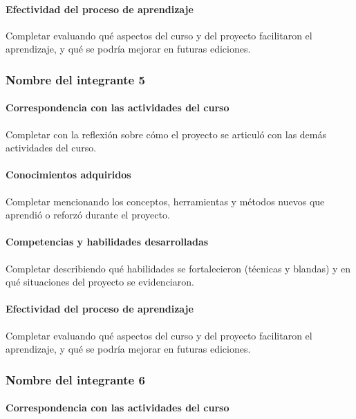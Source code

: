\documentclass[11pt,a4paper]{article}
\begin{document}
\paragraph{Efectividad del proceso de aprendizaje}

Completar evaluando qué aspectos del curso y del proyecto facilitaron el
aprendizaje, y qué se podría mejorar en futuras ediciones.

\subsubsection*{Nombre del integrante 5}


\paragraph{Correspondencia con las actividades del curso}

Completar con la reflexión sobre cómo el proyecto se articuló con las demás
actividades del curso.

\paragraph{Conocimientos adquiridos}

Completar mencionando los conceptos, herramientas y métodos nuevos que
aprendió o reforzó durante el proyecto.

\paragraph{Competencias y habilidades desarrolladas}

Completar describiendo qué habilidades se fortalecieron (técnicas y blandas)
y en qué situaciones del proyecto se evidenciaron.

\paragraph{Efectividad del proceso de aprendizaje}

Completar evaluando qué aspectos del curso y del proyecto facilitaron el
aprendizaje, y qué se podría mejorar en futuras ediciones.

\subsubsection*{Nombre del integrante 6}


\paragraph{Correspondencia con las actividades del curso}
\end{document}
